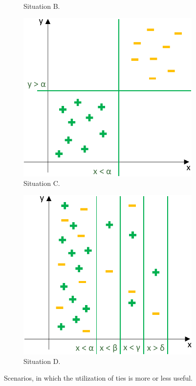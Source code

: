 \begin{figure}
\begin{subfigure}[b]{0.5\textwidth}
        \caption{Situation B.}\label{fig:tiesB}
    \end{subfigure}
    \begin{subfigure}[b]{0.5\textwidth}
        \centering
        \includegraphics[width=\textwidth]{figures/ties_C.pdf}
        \caption{Situation C.}\label{fig:tiesC}
    \end{subfigure}%
    \begin{subfigure}[b]{0.5\textwidth}
        \centering
        \includegraphics[width=\textwidth]{figures/ties_D.pdf}
        \caption{Situation D.}\label{fig:tiesD}
    \end{subfigure}
    \caption{Scenarios, in which the utilization of ties is more or less useful.}\label{fig:ties}
\end{figure}

